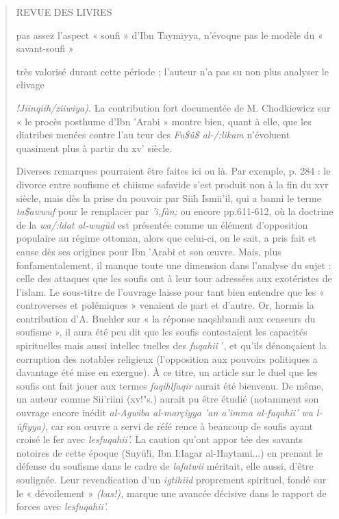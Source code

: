 \begin{quote}
REVUE DES LIVRES

pas assez l'aspect « soufi » d'Ibn Taymiyya, n'évoque pas le modèle du «
savant-soufi »

très valorisé durant cette période ; l'auteur n'a pas su non plus
analyser le clivage

\emph{!Jiinqiih/ziiwiya).} La contribution fort documentée de M.
Chodkiewicz sur « le procès posthume d'Ibn 'Arabi » montre bien, quant à
elle, que les diatribes menées contre l'au­ teur des \emph{Fu\$û\$
al-/:likam} n'évoluent quasiment plus à partir du xv' siècle.

Diverses remarques pourraient être faites ici ou là. Par exemple, p. 284
: le divorce entre soufisme et chiisme safavide s'est produit non à la
fin du xvr siècle, mais dès la prise du pouvoir par Siih Ismii'il, qui a
banni le terme \emph{ta\$awwuf} pour le remplacer par \emph{'i,fàn;} ou
encore pp.611-612, où la doctrine de la \emph{wa/:ldat al-wugüd} est
présentée comme un élément d'opposition populaire au régime ottoman,
alors que celui-ci, on le sait, a pris fait et cause dès ses origines
pour Ibn 'Arabi et son œuvre. Mais, plus fonfamentalement, il manque
toute une dimension dans l'analyse du sujet : celle des attaques que les
soufis ont à leur tour adressées aux exotéristes de l'islam. Le
sous-titre de l'ouvrage laisse pour­ tant bien entendre que les «
controverses et polémiques » venaient de part et d'autre. Or, hormis la
contribution d'A. Buehler sur « la réponse naqshbandi aux censeurs du
soufisme », il aura été peu dit que les soufis contestaient les
capacités spirituelles mais aussi intellec­ tuelles des \emph{fuqahii}
', et qu'ils dénonçaient la corruption des notables religieux
(l'opposition aux pouvoirs politiques a davantage été mise en exergue).
À ce titre, un article sur le duel que les soufis ont fait jouer aux
termes \emph{faqihlfaqir} aurait été bienvenu. De même, un auteur comme
Sii'riini (xv!"s.) aurait pu être étudié (notamment son ouvrage encore
inédit \emph{al-Agwiba al-marçiyya 'an a'imma al-fuqahii' wa l-
ûfiyya),} car son œuvre a servi de réfé­ rence à beaucoup de soufis
ayant croisé le fer avec \emph{lesfuqahii'.} La caution qu'ont appor­
tée des savants notoires de cette époque (Suyü!i, Ibn I:Iagar
al-Haytami...) en prenant le défense du soufisme dans le cadre de
\emph{lafatwii} méritait, elle aussi, d'être soulignée. Leur
revendication d'un \emph{igtihiid} proprement spirituel, fondé sur le «
dévoilement » \emph{(kas!),} marque une avancée décisive dans le rapport
de forces avec \emph{lesfuqahii'.}


\end{quote}
